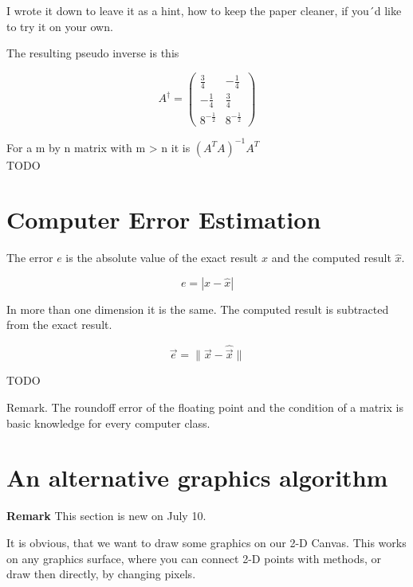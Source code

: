 \documentclass[a4paper]{article}
\begin{document}
\begin{PropositionOpt4}
I wrote it down to leave it as a hint, how to keep the paper cleaner, if you´d like to try it on your own.

The resulting pseudo inverse is this

\begin{displaymath}
A^{\dagger} = \begin{pmatrix}
	\frac34 & -\frac14 \\
	-\frac14 & \frac34 \\
	8^{-\frac12} & 8^{-\frac12}
\end{pmatrix}
\end{displaymath}







For a m by n matrix with m > n it is $(A^{T}A)^{-1}A^T$\\
TODO\\

\section{Computer Error Estimation}

The error $e$ is the absolute value of the exact result $x$ and the computed result $\hat{x}$.

\begin{displaymath}
e = |x - \hat{x}|
\end{displaymath}

In more than one dimension it is the same. The computed result is subtracted from the exact result.

\begin{displaymath}
\vec{e} = \|\vec{x} - \hat{\vec{x}}\|
\end{displaymath}


TODO

Remark. The roundoff error of the floating point and the condition of a matrix is basic knowledge for every computer class.

\section{An alternative graphics algorithm}

\textbf{Remark} This section is new on July 10.

It is obvious, that we want to draw some graphics on our 2-D Canvas. This works on any graphics surface, where you can connect 2-D points with methods, or draw then directly, by changing pixels.


\end{PropositionOpt4}
\end{document}
